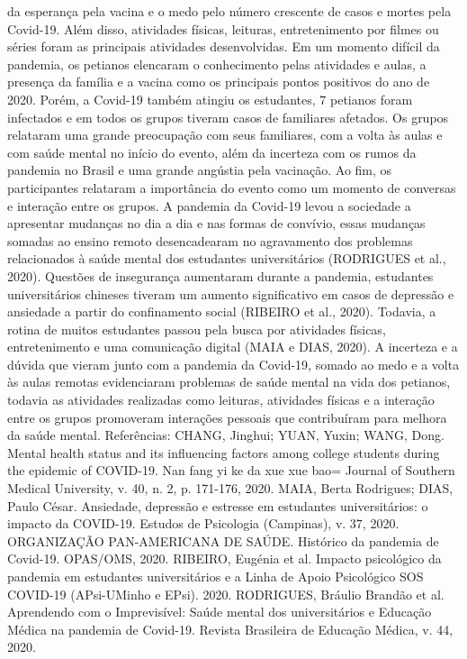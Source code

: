 da esperança pela vacina e o medo pelo número crescente de casos e mortes pela Covid-19.
Além disso, atividades físicas, leituras, entretenimento por filmes ou séries foram as principais 
atividades desenvolvidas. Em um momento difícil da pandemia, os petianos elencaram o 
conhecimento pelas atividades e aulas, a presença da família e a vacina como os principais pontos 
positivos do ano de 2020. Porém, a Covid-19 também atingiu os estudantes, 7 petianos foram 
infectados e em todos os grupos tiveram casos de familiares afetados.
Os grupos relataram uma grande preocupação com seus familiares, com a volta às aulas e com 
saúde mental no início do evento, além da incerteza com os rumos da pandemia no Brasil e uma 
grande angústia pela vacinação. Ao fim, os participantes relataram a importância do evento como um 
momento de conversas e interação entre os grupos.
A pandemia da Covid-19 levou a sociedade a apresentar mudanças no dia a dia e nas formas 
de convívio, essas mudanças somadas ao ensino remoto desencadearam no agravamento dos 
problemas relacionados à saúde mental dos estudantes universitários (RODRIGUES et al., 2020). 
Questões de insegurança aumentaram durante a pandemia, estudantes universitários chineses tiveram 
um aumento significativo em casos de depressão e ansiedade a partir do confinamento social 
(RIBEIRO et al., 2020). Todavia, a rotina de muitos estudantes passou pela busca por atividades 
físicas, entretenimento e uma comunicação digital (MAIA e DIAS, 2020).
A incerteza e a dúvida que vieram junto com a pandemia da Covid-19, somado ao medo e a 
volta às aulas remotas evidenciaram problemas de saúde mental na vida dos petianos, todavia as 
atividades realizadas como leituras, atividades físicas e a interação entre os grupos promoveram
interações pessoais que contribuíram para melhora da saúde mental.
Referências:
CHANG, Jinghui; YUAN, Yuxin; WANG, Dong. Mental health status and its influencing factors 
among college students during the epidemic of COVID-19. Nan fang yi ke da xue xue bao= Journal
of Southern Medical University, v. 40, n. 2, p. 171-176, 2020.
MAIA, Berta Rodrigues; DIAS, Paulo César. Ansiedade, depressão e estresse em estudantes 
universitários: o impacto da COVID-19. Estudos de Psicologia (Campinas), v. 37, 2020.
ORGANIZAÇÃO PAN-AMERICANA DE SAÚDE. Histórico da pandemia de Covid-19.
OPAS/OMS, 2020.
RIBEIRO, Eugénia et al. Impacto psicológico da pandemia em estudantes universitários e a Linha de 
Apoio Psicológico SOS COVID-19 (APsi-UMinho e EPsi). 2020.
RODRIGUES, Bráulio Brandão et al. Aprendendo com o Imprevisível: Saúde mental dos 
universitários e Educação Médica na pandemia de Covid-19. Revista Brasileira de Educação 
Médica, v. 44, 2020.

